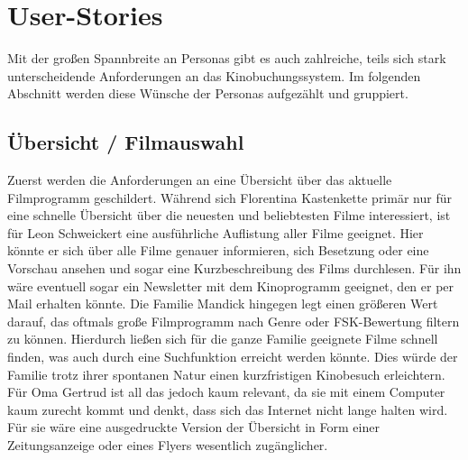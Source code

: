 \section{User-Stories}

Mit der großen Spannbreite an Personas gibt es auch zahlreiche, teils sich stark unterscheidende Anforderungen an das Kinobuchungssystem.
Im folgenden Abschnitt werden diese Wünsche der Personas aufgezählt und gruppiert.

\subsection{Übersicht / Filmauswahl}
Zuerst werden die Anforderungen an eine Übersicht über das aktuelle Filmprogramm geschildert.
Während sich Florentina Kastenkette primär nur für eine schnelle Übersicht über die neuesten und beliebtesten Filme interessiert, ist für Leon Schweickert eine ausführliche Auflistung aller Filme geeignet.
Hier könnte er sich über alle Filme genauer informieren, sich Besetzung oder eine Vorschau ansehen und sogar eine Kurzbeschreibung des Films durchlesen.
Für ihn wäre eventuell sogar ein Newsletter mit dem Kinoprogramm geeignet, den er per Mail erhalten könnte.
Die Familie Mandick hingegen legt einen größeren Wert darauf, das oftmals große Filmprogramm nach Genre oder FSK-Bewertung filtern zu können.
Hierdurch ließen sich für die ganze Familie geeignete Filme schnell finden, was auch durch eine Suchfunktion erreicht werden könnte.
Dies würde der Familie trotz ihrer spontanen Natur einen kurzfristigen Kinobesuch erleichtern.
Für Oma Gertrud ist all das jedoch kaum relevant, da sie mit einem Computer kaum zurecht kommt und denkt, dass sich das Internet nicht lange halten wird.
Für sie wäre eine ausgedruckte Version der Übersicht in Form einer Zeitungsanzeige oder eines Flyers wesentlich zugänglicher.

